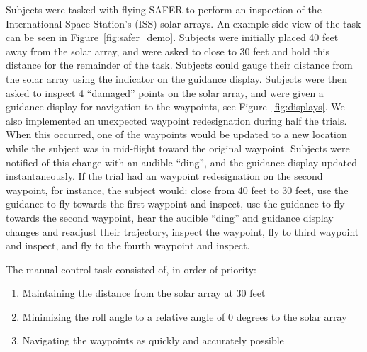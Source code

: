 \documentclass[]{aiaa-tc}%
\begin{document}
Subjects were tasked with flying SAFER to perform an inspection of the International Space Station's (ISS) solar arrays. An example side view of the task can be seen in Figure~\ref{fig:safer_demo}. Subjects were initially placed 40 feet away from the solar array, and were asked to close to 30 feet and hold this distance for the remainder of the task. Subjects could gauge their distance from the solar array using the indicator on the guidance display. Subjects were then asked to inspect 4 ``damaged'' points on the solar array, and were given a guidance display for navigation to the waypoints, see Figure~\ref{fig:displays}. We also implemented an unexpected waypoint redesignation during half the trials. When this occurred, one of the waypoints would be updated to a new location while the subject was in mid-flight toward the original waypoint. Subjects were notified of this change with an audible ``ding'', and the guidance display updated instantaneously. If the trial had an waypoint redesignation on the second waypoint, for instance, the subject would: close from 40 feet to 30 feet, use the guidance to fly towards the first waypoint and inspect, use the guidance to fly towards the second waypoint, hear the audible ``ding'' and guidance display changes and readjust their trajectory, inspect the waypoint, fly to third waypoint and inspect, and fly to the fourth waypoint and inspect.

The manual-control task consisted of, in order of priority:
\begin{enumerate}
  \itemsep0em
  \item Maintaining the distance from the solar array at 30 feet
  \item Minimizing the roll angle to a relative angle of 0 degrees to the solar array
  \item Navigating the waypoints as quickly and accurately possible
\end{enumerate}
\end{document}
